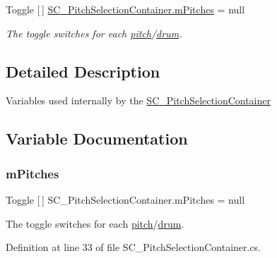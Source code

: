\begin{DoxyCompactItemize}
Toggle \mbox{[}$\,$\mbox{]} \hyperlink{group___s_c___p_s_c_priv_var_ga25180add92621da773b024083d3a61af}{S\+C\+\_\+\+Pitch\+Selection\+Container.\+m\+Pitches} = null
\begin{DoxyCompactList}\small\item\em The toggle switches for each \hyperlink{group___music_enums_ga508f69b199ea518f935486c990edac1d}{pitch}/\hyperlink{group___music_enums_gade475b4382c7066d1af13e7c13c029b6}{drum}. \end{DoxyCompactList}\end{DoxyCompactItemize}


\subsection{Detailed Description}
Variables used internally by the \hyperlink{class_s_c___pitch_selection_container}{S\+C\+\_\+\+Pitch\+Selection\+Container} 

\subsection{Variable Documentation}
\mbox{\label{group___s_c___p_s_c_priv_var_ga25180add92621da773b024083d3a61af}} 
\subsubsection{\texorpdfstring{m\+Pitches}{mPitches}}
{\footnotesize\ttfamily Toggle \mbox{[}$\,$\mbox{]} S\+C\+\_\+\+Pitch\+Selection\+Container.\+m\+Pitches = null\hspace{0.3cm}{\ttfamily [private]}}



The toggle switches for each \hyperlink{group___music_enums_ga508f69b199ea518f935486c990edac1d}{pitch}/\hyperlink{group___music_enums_gade475b4382c7066d1af13e7c13c029b6}{drum}. 



Definition at line 33 of file S\+C\+\_\+\+Pitch\+Selection\+Container.\+cs.

\mbox{\label{group___s_c___p_s_c_priv_var_ga8431846d376b98bc6de5a872cce2c596}} 

